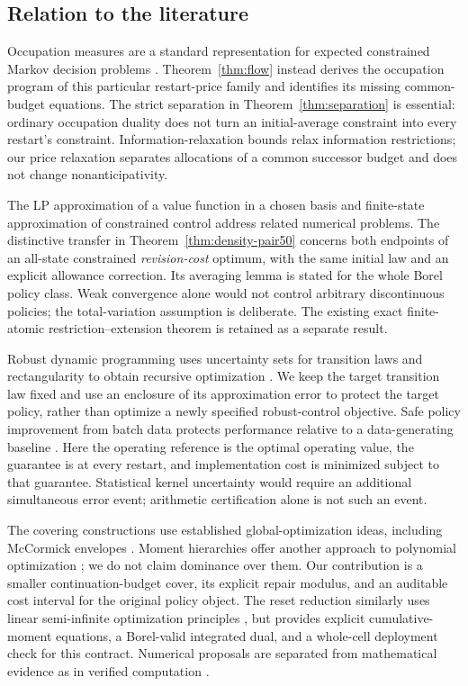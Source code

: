\subsection{Relation to the literature}
Occupation measures are a standard representation for expected constrained Markov decision problems \citep{Altman1999}. Theorem~\ref{thm:flow} instead derives the occupation program of this particular restart-price family and identifies its missing common-budget equations. The strict separation in Theorem~\ref{thm:separation} is essential: ordinary occupation duality does not turn an initial-average constraint into every restart's constraint. Information-relaxation bounds \citep{BrownSmithSun2010,BrownSmith2014} relax information restrictions; our price relaxation separates allocations of a common successor budget and does not change nonanticipativity.

The LP approximation of a value function in a chosen basis \citep{deFariasVanRoy2003} and finite-state approximation of constrained control \citep{DufourPrietoRumeau2013,Saldi2018} address related numerical problems. The distinctive transfer in Theorem~\ref{thm:density-pair50} concerns both endpoints of an all-state constrained \emph{revision-cost} optimum, with the same initial law and an explicit allowance correction. Its averaging lemma is stated for the whole Borel policy class. Weak convergence alone would not control arbitrary discontinuous policies; the total-variation assumption is deliberate. The existing exact finite-atomic restriction--extension theorem is retained as a separate result.

Robust dynamic programming uses uncertainty sets for transition laws and rectangularity to obtain recursive optimization \citep{Iyengar2005,NilimElGhaoui2005}. We keep the target transition law fixed and use an enclosure of its approximation error to protect the target policy, rather than optimize a newly specified robust-control objective. Safe policy improvement from batch data protects performance relative to a data-generating baseline \citep{Laroche2019}. Here the operating reference is the optimal operating value, the guarantee is at every restart, and implementation cost is minimized subject to that guarantee. Statistical kernel uncertainty would require an additional simultaneous error event; arithmetic certification alone is not such an event.

The covering constructions use established global-optimization ideas, including McCormick envelopes \citep{McCormick1976}. Moment hierarchies offer another approach to polynomial optimization \citep{Lasserre2001}; we do not claim dominance over them. Our contribution is a smaller continuation-budget cover, its explicit repair modulus, and an auditable cost interval for the original policy object. The reset reduction similarly uses linear semi-infinite optimization principles \citep{HettichKortanek1993}, but provides explicit cumulative-moment equations, a Borel-valid integrated dual, and a whole-cell deployment check for this contract. Numerical proposals are separated from mathematical evidence as in verified computation \citep{Rump2010}.

